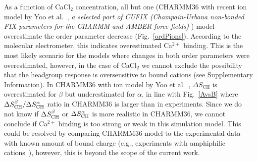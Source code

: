 \documentclass[pre,aps,floatfix,authordate1-4,twocolumn]{revtex4-1}
\begin{document}



As a function of CaCl$_2$ concentration, all but one (CHARMM36 with recent ion model by Yoo et al.~\cite{yoo16},
{\it a selected part of CUFIX (Champain-Urbana non-bonded FIX parameters for the CHARMM and AMBER force fields)}
)
model overestimate the order parameter decrease (Fig.~\ref{ordPions}). 
According to the molecular electrometer, this indicates overestimated Ca$^{2+}$ binding. 
This is the most likely scenario for the models where changes in both order parameters were overestimated,
however, in the case of CaCl$_2$ we cannot exclude the possibility that the headgroup response is oversensitive to
bound cations (see Supplementary Information).
In CHARMM36 with ion model by Yoo et al.~\cite{yoo16},
$\Delta S_\mathrm{CH}$ is overestimated for $\beta$  but underestimated for  $\alpha$,
in line with Fig.~\ref{AvsB} where $\Delta S_{\rm{CH}}^{\beta}/\Delta S_{\rm{CH}}^{\alpha}$ ratio
in CHARMM36 is larger  than in experiments. Since we do not know if $\Delta S_{\rm{CH}}^{\beta}$ or $\Delta S_{\rm{CH}}^{\alpha}$
is more realistic in CHARMM36, we cannot conclude if Ca$^{2+}$ binding is too strong or weak in this simulation model.
This could be resolved by comparing CHARMM36 model to the experimental data with known amount of bound charge 
(e.g., experiments with amphiphilic cations~\cite{scherer89,franzin98}), however, this is beyond the scope of the
current work. 

\end{document}
